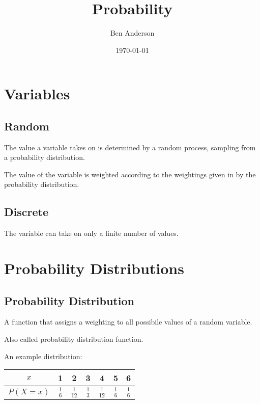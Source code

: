 \documentclass[a4paper,11pt]{article}
\begin{document}
\title{Probability}
\author{Ben Anderson}
\date{\today}
\maketitle
\pagebreak

\tableofcontents
\pagebreak


\section{Variables}

\subsection{Random}

The value a variable takes on is determined by a random process, sampling from
a probability distribution.

The value of the variable is weighted according to the weightings given in by
the probability distribution.


\subsection{Discrete}

The variable can take on only a finite number of values.




\section{Probability Distributions}

\subsection{Probability Distribution}

A function that assigns a weighting to all possibile values of a random
variable.

Also called probability distribution function.

An example distribution:

\begin{center}
\begin{tabular}{c|c|c|c|c|c|c}
$x$ & 1 & 2 & 3 & 4 & 5 & 6 \\
\hline
$P(X = x)$ & $\frac{1}{6}$ & $\frac{1}{12}$ & $\frac{1}{3}$ & $\frac{1}{12}$ & $\frac{1}{6}$ & $\frac{1}{6}$ \\
\end{tabular}
\end{center}
\end{document}
